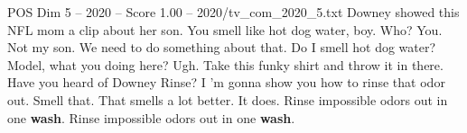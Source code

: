 \begin{textsample}{POS Dim 5 – 2020 – Score 1.00 – 2020/tv\_com\_2020\_5.txt}  \label{ex:f5_pos_033}
Downey showed this NFL mom a clip about her son.
You smell like hot dog water, boy.
Who?
You.
Not my son.
We need to do something about that.
Do I smell hot dog water?
Model, what you doing here?
Ugh.
Take this funky shirt and throw it in there.
Have you heard of Downey Rinse?
I 'm gonna show you how to rinse that odor out.
Smell that.
That smells a lot better.
It does.
Rinse impossible odors out in one \textbf{wash}.
Rinse impossible odors out in one \textbf{wash}.

\end{textsample}
